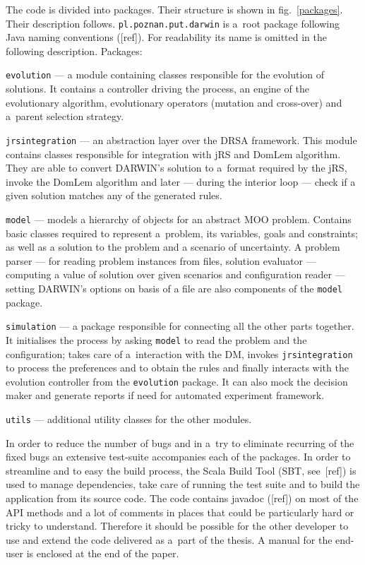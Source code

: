 The code is divided into packages. Their structure is shown in
fig.~\ref{packages}. Their description follows. \texttt{pl.poznan.put.darwin}
is a~root package following Java naming conventions ([ref]). For readability
its name is omitted in the following
description. Packages:
\begin{description}
  \item{\texttt{evolution}} --- a module containing classes responsible for
    the evolution of solutions. It contains a controller driving the process,
    an engine of the evolutionary algorithm, evolutionary operators (mutation
    and cross-over) and a~parent selection strategy.

  \item{\texttt{jrsintegration}} --- an abstraction layer over the DRSA
    framework. This module contains classes responsible for integration with
    jRS and DomLem algorithm. They are able to convert DARWIN's solution to
    a~format required by the jRS, invoke the DomLem algorithm and later ---
    during the interior loop --- check if a given solution matches any of the
    generated rules.

  \item{\texttt{model}} --- models a hierarchy of objects for an abstract MOO
    problem. Contains basic classes required to represent a~problem, its
    variables, goals and constraints; as well as a solution to the problem and
    a scenario of uncertainty. A problem parser --- for reading problem
    instances from files, solution evaluator --- computing a value of solution
    over given scenarios and configuration reader --- setting DARWIN's options
    on basis of a file are also components of the \texttt{model} package.
  \item{\texttt{simulation}} --- a package responsible for connecting all the
    other parts together. It initialises the process by asking \texttt{model}
    to read the problem and the configuration; takes care of a~interaction
    with the DM, invokes \texttt{jrsintegration} to process the preferences
    and to obtain the rules and finally interacts with the evolution
    controller from the \texttt{evolution} package. It can also mock the
    decision maker and generate reports if need for automated experiment
    framework.

  \item{\texttt{utils}} --- additional utility classes for the other modules.
\end{description}

In order to reduce the number of bugs and in a~try to eliminate recurring of
the fixed bugs an extensive test-suite accompanies each of the packages. In
order to streamline and to easy the build process, the Scala Build Tool (SBT,
see~[ref]) is used to manage dependencies, take care of running the test suite
and to build the application from its source code. The code contains javadoc
([ref]) on most of the API methods and a lot of comments in places that could
be particularly hard or tricky to understand. Therefore it should be possible
for the other developer to use and extend the code delivered as a~part of the
thesis. A manual for the end-user is enclosed at the end of the paper.

